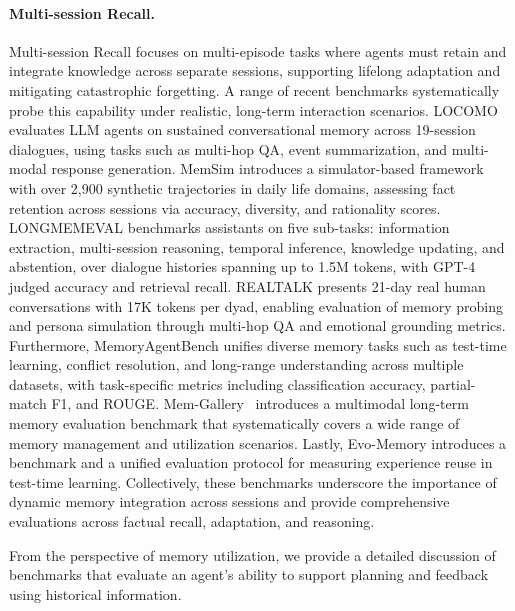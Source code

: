 \paragraph{Multi-session Recall.}
Multi-session Recall focuses on multi-episode tasks where agents must retain and integrate knowledge across separate sessions, supporting lifelong adaptation and mitigating catastrophic forgetting. A range of recent benchmarks systematically probe this capability under realistic, long-term interaction scenarios. LOCOMO \cite{maharana2024evaluating} evaluates LLM agents on sustained conversational memory across 19-session dialogues, using tasks such as multi-hop QA, event summarization, and multi-modal response generation. MemSim \cite{zhang2024memsim} introduces a simulator-based framework with over 2,900 synthetic trajectories in daily life domains, assessing fact retention across sessions via accuracy, diversity, and rationality scores. LONGMEMEVAL \cite{wu2024longmemeval} benchmarks assistants on five sub-tasks: information extraction, multi-session reasoning, temporal inference, knowledge updating, and abstention, over dialogue histories spanning up to 1.5M tokens, with GPT-4 judged accuracy and retrieval recall. REALTALK \cite{lee2025realtalk} presents 21-day real human conversations with 17K tokens per dyad, enabling evaluation of memory probing and persona simulation through multi-hop QA and emotional grounding metrics. Furthermore, MemoryAgentBench \cite{hu2025evaluating} unifies diverse memory tasks such as test-time learning, conflict resolution, and long-range understanding across multiple datasets, with task-specific metrics including classification accuracy, partial-match F1, and ROUGE. Mem-Gallery~\cite{bei2026mem} introduces a multimodal long-term memory evaluation benchmark that systematically covers a wide range of memory management and utilization scenarios. Lastly, Evo-Memory \cite{wei2025evo} introduces a benchmark and a unified evaluation protocol for measuring experience reuse in test-time learning. Collectively, these benchmarks underscore the importance of dynamic memory integration across sessions and provide comprehensive evaluations across factual recall, adaptation, and reasoning. 

From the perspective of memory utilization, we provide a detailed discussion of benchmarks that evaluate an agent’s ability to support planning and feedback using historical information.

